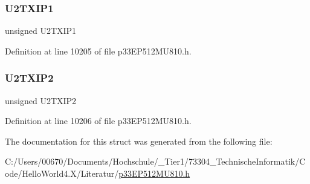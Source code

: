 \subsubsection{\texorpdfstring{U2\+T\+X\+I\+P1}{U2TXIP1}}
{\footnotesize\ttfamily unsigned U2\+T\+X\+I\+P1}



Definition at line 10205 of file p33\+E\+P512\+M\+U810.\+h.

\mbox{\label{structtag_i_p_c7_b_i_t_s_af422feb5bf33772e0ad81b5f1c6b272a}} 
\subsubsection{\texorpdfstring{U2\+T\+X\+I\+P2}{U2TXIP2}}
{\footnotesize\ttfamily unsigned U2\+T\+X\+I\+P2}



Definition at line 10206 of file p33\+E\+P512\+M\+U810.\+h.



The documentation for this struct was generated from the following file\+:\begin{DoxyCompactItemize}
\item 
C\+:/\+Users/00670/\+Documents/\+Hochschule/\+\_\+\+Tier1/73304\+\_\+\+Technische\+Informatik/\+Code/\+Hello\+World4.\+X/\+Literatur/\hyperlink{p33_e_p512_m_u810_8h}{p33\+E\+P512\+M\+U810.\+h}\end{DoxyCompactItemize}

